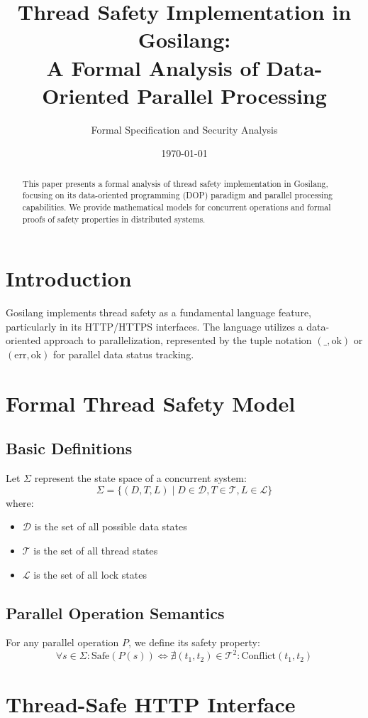 \documentclass{article}
\title{Thread Safety Implementation in Gosilang:\\A Formal Analysis of Data-Oriented Parallel Processing}
\author{Formal Specification and Security Analysis}
\date{\today}
\begin{document}
\maketitle

\begin{abstract}
This paper presents a formal analysis of thread safety implementation in Gosilang, focusing on its data-oriented programming (DOP) paradigm and parallel processing capabilities. We provide mathematical models for concurrent operations and formal proofs of safety properties in distributed systems.
\end{abstract}

\section{Introduction}
Gosilang implements thread safety as a fundamental language feature, particularly in its HTTP/HTTPS interfaces. The language utilizes a data-oriented approach to parallelization, represented by the tuple notation $(\_,\text{ok})$ or $(\text{err},\text{ok})$ for parallel data status tracking.

\section{Formal Thread Safety Model}
\subsection{Basic Definitions}
Let $\Sigma$ represent the state space of a concurrent system:
\[
\Sigma = \{(D, T, L) \mid D \in \mathcal{D}, T \in \mathcal{T}, L \in \mathcal{L}\}
\]
where:
\begin{itemize}
    \item $\mathcal{D}$ is the set of all possible data states
    \item $\mathcal{T}$ is the set of all thread states
    \item $\mathcal{L}$ is the set of all lock states
\end{itemize}

\subsection{Parallel Operation Semantics}
For any parallel operation $P$, we define its safety property:
\[
\forall s \in \Sigma: \text{Safe}(P(s)) \iff \nexists (t_1, t_2) \in \mathcal{T}^2: \text{Conflict}(t_1, t_2)
\]

\section{Thread-Safe HTTP Interface}
\end{document}
